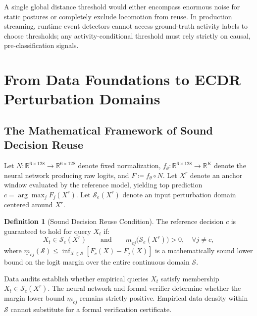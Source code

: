 \documentclass[11pt,a4paper]{article}
\newcommand{\R}{\mathbb R}
\theoremstyle{definition}
\newtheorem{definition}[proposition]{Definition}
\begin{document}
A single global distance threshold would either encompass enormous noise for static postures or completely exclude locomotion from reuse. In production streaming, runtime event detectors cannot access ground-truth activity labels to choose thresholds; any activity-conditional threshold must rely strictly on causal, pre-classification signals.

\section{From Data Foundations to ECDR Perturbation Domains}

\subsection{The Mathematical Framework of Sound Decision Reuse}
Let $N: \R^{6 \times 128} \to \R^{6 \times 128}$ denote fixed normalization, $f_\theta: \R^{6 \times 128} \to \R^K$ denote the neural network producing raw logits, and $F \coloneqq f_\theta \circ N$.
Let $X^r$ denote an anchor window evaluated by the reference model, yielding top prediction $c = \arg\max_j F_j(X^r)$. Let $\mathcal{S}_e(X^r)$ denote an input perturbation domain centered around $X^r$.

\begin{definition}[Sound Decision Reuse Condition]
The reference decision $c$ is guaranteed to hold for query $X_t$ if:
\begin{equation}\label{eq:cert_condition}
X_t \in \mathcal{S}_e(X^r) \qquad \text{and} \qquad \underline{m}_{cj}\big(\mathcal{S}_e(X^r)\big) > 0, \quad \forall j \ne c,
\end{equation}
where $\underline{m}_{cj}(\mathcal{S}) \le \inf_{X \in \mathcal{S}} [F_c(X) - F_j(X)]$ is a mathematically sound lower bound on the logit margin over the entire continuous domain $\mathcal{S}$.
\end{definition}

Data audits establish whether empirical queries $X_t$ satisfy membership $X_t \in \mathcal{S}_e(X^r)$. The neural network and formal verifier determine whether the margin lower bound $\underline{m}_{cj}$ remains strictly positive. Empirical data density within $\mathcal{S}$ cannot substitute for a formal verification certificate.
\end{document}
